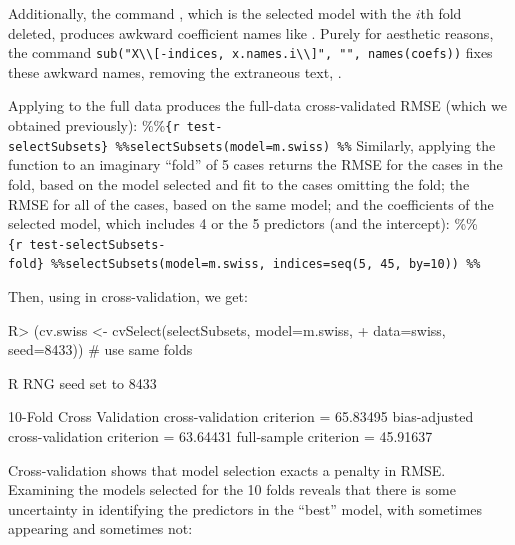 \documentclass[
]{jss}
\begin{document}
Additionally, the command
, which is the
selected model with the \(i\)th fold deleted, produces awkward
coefficient names like .
Purely for aesthetic reasons, the command
\texttt{sub("X\textbackslash{}\textbackslash{}{[}-indices,\ x.names.i\textbackslash{}\textbackslash{}{]}",\ "",\ names(coefs))}
fixes these awkward names, removing the extraneous text,
.

Applying  to the full data produces the full-data
cross-validated RMSE (which we obtained previously):
\%\%\texttt{\{r\ test-selectSubsets\}\ \%\%selectSubsets(model=m.swiss)\ \%\%}
Similarly, applying the function to an imaginary ``fold'' of 5 cases
returns the RMSE for the cases in the fold, based on the model selected
and fit to the cases omitting the fold; the RMSE for all of the cases,
based on the same model; and the coefficients of the selected model,
which includes 4 or the 5 predictors (and the intercept):
\%\%\texttt{\{r\ test-selectSubsets-fold\}\ \%\%selectSubsets(model=m.swiss,\ indices=seq(5,\ 45,\ by=10))\ \%\%}

Then, using  in cross-validation, we get:

\begin{CodeChunk}
\begin{CodeInput}
R> (cv.swiss <- cvSelect(selectSubsets, model=m.swiss,
+                       data=swiss, seed=8433)) # use same folds
\end{CodeInput}
\begin{CodeOutput}
R RNG seed set to 8433
\end{CodeOutput}
\begin{CodeOutput}
10-Fold Cross Validation
cross-validation criterion = 65.83495
bias-adjusted cross-validation criterion = 63.64431
full-sample criterion = 45.91637 
\end{CodeOutput}
\end{CodeChunk}

Cross-validation shows that model selection exacts a penalty in RMSE.
Examining the models selected for the 10 folds reveals that there is
some uncertainty in identifying the predictors in the ``best'' model,
with  sometimes appearing and sometimes not:
\end{document}

